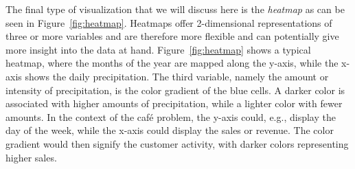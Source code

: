 The final type of visualization that we will discuss here is the \textit{heatmap} as can be seen in
Figure~\ref{fig:heatmap}.
Heatmaps offer 2-dimensional representations of three or more variables and are therefore more flexible and can
potentially give more insight into the data at hand.
Figure~\ref{fig:heatmap} shows a typical heatmap, where the months of the year are mapped along the y-axis, while the
x-axis shows the daily precipitation.
The third variable, namely the amount or intensity of precipitation, is the color gradient of the blue cells.
A darker color is associated with higher amounts of precipitation, while a lighter color with fewer amounts.
In the context of the café problem, the y-axis could, e.g., display the day of the week, while the x-axis could display
the sales or revenue.
The color gradient would then signify the customer activity, with darker colors representing higher sales.
